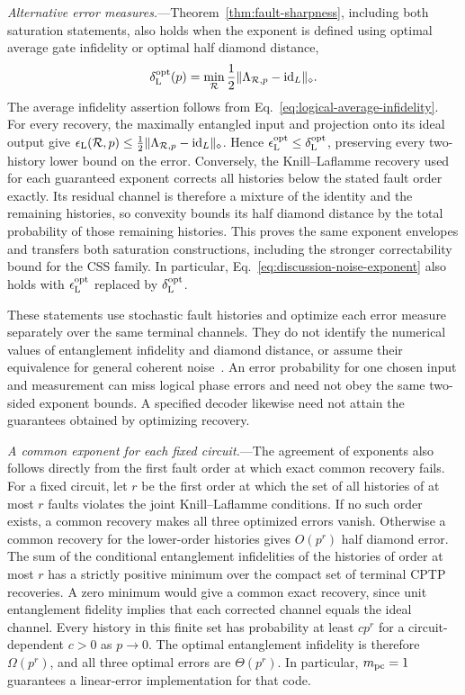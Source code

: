 \documentclass[aps,prl,reprint,longbibliography,nofootinbib,nobibnotes]{revtex4-2}
\begin{document}
\emph{Alternative error measures.}---Theorem~\ref{thm:fault-sharpness}, including both saturation
statements, also holds when the exponent is defined using optimal average gate infidelity or
optimal half diamond distance,
\begin{equation}\label{eq:logical-diamond-error}
 \delta_{\rm L}^{\rm opt}(p)
 =\min_{\mathcal R}\frac{1}{2}
   \|\Lambda_{\mathcal R,p}-\mathrm{id}_L\|_\diamond .
\end{equation}
The average infidelity assertion follows from Eq.~\eqref{eq:logical-average-infidelity}. For every
recovery, the maximally entangled input and projection onto its ideal output give
$\epsilon_{\rm L}(\mathcal R,p)\le
\frac{1}{2}\|\Lambda_{\mathcal R,p}-\mathrm{id}_L\|_\diamond$.
Hence $\epsilon_{\rm L}^{\rm opt}\le\delta_{\rm L}^{\rm opt}$, preserving every two-history lower
bound on the error. Conversely, the Knill--Laflamme recovery used for each guaranteed exponent
corrects all histories below the stated fault order exactly. Its residual channel is therefore a
mixture of the identity and the remaining histories, so convexity bounds its half diamond distance
by the total probability of those remaining histories. This proves the same exponent envelopes and
transfers both saturation constructions, including the stronger correctability bound for the CSS
family. In particular, Eq.~\eqref{eq:discussion-noise-exponent} also holds with $\epsilon_{\rm
L}^{\rm opt}$ replaced by $\delta_{\rm L}^{\rm opt}$.

These statements use stochastic fault histories and optimize each error measure separately over the
same terminal channels. They do not identify the numerical values of entanglement infidelity and
diamond distance, or assume their equivalence for general coherent noise~\cite{KuengMetrics}. An
error probability for one chosen input and measurement can miss logical phase errors and need not
obey the same two-sided exponent bounds. A specified decoder likewise need not attain the
guarantees obtained by optimizing recovery.

\emph{A common exponent for each fixed circuit.}---The agreement of exponents also follows directly
from the first fault order at which exact common recovery fails. For a fixed circuit, let $r$ be
the first order at which the set of all histories of at most $r$ faults violates the joint
Knill--Laflamme conditions. If no such order exists, a common recovery makes all three optimized
errors vanish. Otherwise a common recovery for the lower-order histories gives $O(p^r)$ half
diamond error. The sum of the conditional entanglement infidelities of the histories of order at
most $r$ has a strictly positive minimum over the compact set of terminal CPTP recoveries. A zero
minimum would give a common exact recovery, since unit entanglement fidelity implies that each
corrected channel equals the ideal channel. Every history in this finite set has probability at
least $c p^r$ for a circuit-dependent $c>0$ as $p\to0$. The optimal entanglement infidelity is
therefore $\Omega(p^r)$, and all three optimal errors are $\Theta(p^r)$. In particular, $m_{\rm
pc}=1$ guarantees a linear-error implementation for that code.
\end{document}
